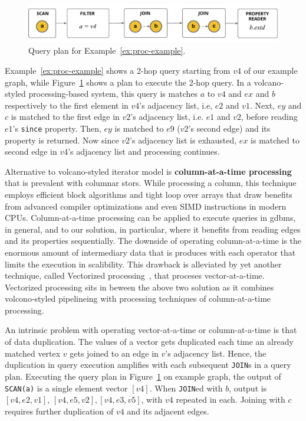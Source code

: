 \begin{figure}
	\hfill\includegraphics[scale=0.78]{img/proc-qp}\hfill
	\vspace{-10pt}
	\caption{Query plan for Example~\ref{ex:proc-example}.}
	\vspace{-8pt}
	\label{fig:proc-qp}
\end{figure}

Example~\ref{ex:proc-example} shows a 2-hop query starting from $v4$ of our example graph, while Figure~\ref{fig:proc-qp} shows a plan to execute the 2-hop query. In a volcano-styled processing-based system, this query is matches $a$ to $v4$ and $ex$ and $b$ respectively to the first element in $v4$'s adjacency list, i.e, $e2$ and $v1$. Next, $ey$ and $c$ is matched to the first edge in $v2$'s adjacency list, i.e. $e1$ and $v2$, before reading $e1$'s \texttt{since} property. Then, $ey$ is matched to $e9$ ($v2$'s second edge) and its property is returned. Now since $v2$'s adjacency list is exhausted, $ex$ is matched to second edge in $v4$'s adjacency list and processing continues. 

Alternative to volcano-styled iterator model is \textbf{column-at-a-time processing}~\cite{boncz-phd, monet-2decades} that is prevalent with columnar stors. While processing a column, this technique employs efficient block algorithms and tight loop over arrays that draw benefits from advanced compiler optimizations and even SIMD instructions in modern CPUs. Column-at-a-time processing can be applied to execute queries in \gls{gdbms}, in general, and to our solution, in particular, where it benefits from reading edges and its properties sequentially. The downside of operating column-at-a-time is the enormous amount of intermediary data that is produces with each operator that limits the execution in scalibility. This drawback is alleviated by yet another technique, called Vectorized processing~\cite{boncz-vectorwise1, boncz-monet-vectorized, boncz-vectorwise}, that proceses vector-at-a-time. Vectorized processing sits in beween the above two solution as it combines volcono-styled pipelineing with processing techniques of column-at-a-time processing. 

An intrinsic problem with operating vector-at-a-time or column-at-a-time is that of data duplication. The values of a vector gets duplicated each time an already matched vertex $v$ gets joined to an edge in $v$'s adjacency list. Hence, the duplication in query execution amplifies with each subsequent \texttt{JOIN}s in a query plan. Executing the query plan in Figure~\ref{fig:proc-qp} on example graph, the output of \texttt{SCAN(a)} is a single element vector $[v4]$. When \texttt{JOIN}ed with $b$, output is $[v4, e2, v1]$, $[v4, e5, v2], [v4, e3, v5]$, with $v4$ repeated in each. Joining with $c$ requires further duplication of $v4$ and its adjacent edges.

